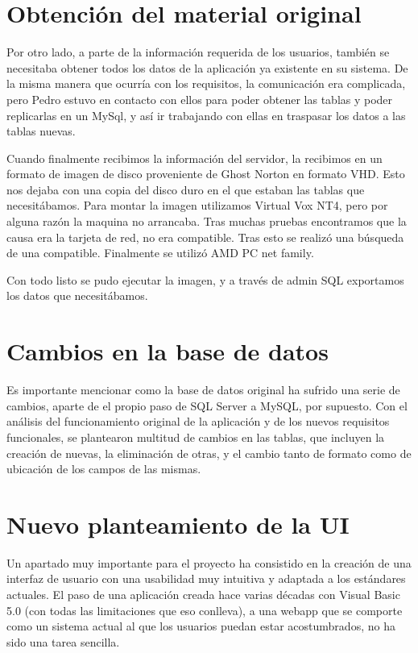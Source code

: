 \section{Obtención del material original}

Por otro lado, a parte de la información requerida de los usuarios, también se necesitaba obtener todos los datos de la aplicación ya existente en su sistema. De la misma manera que ocurría con los requisitos, la comunicación era complicada, pero Pedro estuvo en contacto con ellos para poder obtener las tablas y poder replicarlas en un MySql, y así ir trabajando con ellas en traspasar los datos a las tablas nuevas.

Cuando finalmente recibimos la información del servidor, la recibimos en un formato de imagen de disco proveniente de Ghost Norton en formato VHD. Esto nos dejaba con una copia del disco duro en el que estaban las tablas que necesitábamos.
Para montar la imagen utilizamos Virtual Vox NT4, pero por alguna razón la maquina no arrancaba. Tras muchas pruebas encontramos que la causa era la tarjeta de red, no era compatible. Tras esto se realizó una búsqueda de una compatible. Finalmente se utilizó AMD PC net family. 

Con todo listo se pudo ejecutar la imagen, y a través de admin SQL exportamos los datos que necesitábamos.

\section{Cambios en la base de datos}

Es importante mencionar como la base de datos original ha sufrido una serie de cambios,  aparte de el propio paso de SQL Server a MySQL, por supuesto. Con el análisis del funcionamiento original de la aplicación y de los nuevos requisitos funcionales, se plantearon multitud de cambios en las tablas, que incluyen la creación de nuevas, la eliminación de otras, y el cambio tanto de formato como de ubicación de los campos de las mismas.

\section{Nuevo planteamiento de la UI}

Un apartado muy importante para el proyecto ha consistido en la creación de una interfaz de usuario con una usabilidad muy intuitiva y adaptada a los estándares actuales. El paso de una aplicación creada hace varias décadas con Visual Basic 5.0 (con todas las limitaciones que eso conlleva), a una webapp que se comporte como un sistema actual al que los usuarios puedan estar acostumbrados, no ha sido una tarea sencilla. 

